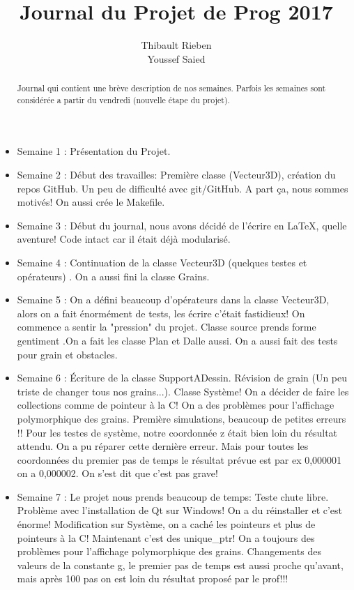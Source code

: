 \documentclass[a4paper,10pt]{article}
\title{Journal du Projet de Prog 2017}
\author{Thibault Rieben \\ Youssef Saied }
\begin{document}
\maketitle

\begin{abstract}

Journal qui contient une brève description de nos semaines. Parfois les semaines sont considérée a partir du vendredi (nouvelle étape du projet).

\end{abstract}

\begin{itemize}
 \item Semaine 1 : Présentation du Projet. 
 
 
 \item Semaine 2 : Début des travailles: Première classe (Vecteur3D), création du repos GitHub.
 Un peu de difficulté avec git/GitHub. A part ça, nous sommes motivés! On aussi crée le Makefile.
 
 
 \item Semaine 3 : Début du journal, nous avons décidé de l'écrire en LaTeX, quelle aventure!
 Code intact car il était déjà modularisé.

 
 
 \item Semaine 4 : Continuation de la classe Vecteur3D (quelques testes et opérateurs) . On a aussi fini la classe Grains.
 
 
 \item Semaine 5 : On a défini beaucoup d'opérateurs dans la classe Vecteur3D, alors on a fait énormément de tests, les écrire c'était fastidieux! On commence a sentir la "pression" du projet. Classe source prends forme gentiment .On a fait les classe Plan et Dalle aussi. On a aussi fait des tests pour grain et obstacles.
 
 
 \item Semaine 6 : Écriture de la classe SupportADessin. Révision de grain (Un peu triste de changer tous nos grains...). Classe Système! On a décider de faire les collections comme de pointeur à la C! On a des problèmes pour l'affichage polymorphique des grains. Première simulations, beaucoup de petites erreurs !! Pour les testes de système, notre coordonnée z était bien loin du résultat attendu. On a pu réparer cette dernière erreur. Mais pour toutes les coordonnées du premier pas de temps le résultat prévue est par ex 0,000001 on a 0,000002. On s'est dit que c'est pas grave!
 
 
 \item Semaine 7 : Le projet nous prends beaucoup de temps: Teste chute libre. Problème avec l’installation de Qt sur Windows! On a du réinstaller et c'est énorme! Modification sur Système, on a caché les pointeurs et plus de pointeurs à la C! Maintenant c'est des unique\_ptr! On a toujours des problèmes pour l'affichage polymorphique des grains. Changements des valeurs de la constante g, le premier pas de temps est aussi proche qu'avant, mais après 100 pas on est loin du résultat proposé par le prof!!!
 

\end{itemize}
\end{document}
